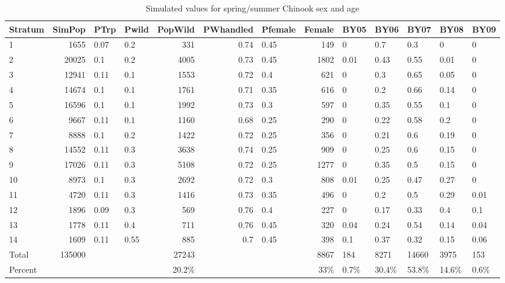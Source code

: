\documentclass[12pt]{article}
\begin{document}
\begin{sidewaystable} %
\caption{Simulated values for spring/summer Chinook sex and age}
\label{table:CHsimSA} 
\centering
\begin{tabular}{ | l | r | l | l | r | r | l | r | l | l | l | l | l | }
\hline
Stratum&SimPop&PTrp&Pwild&PopWild&PWhandled&Pfemale&Female&BY05&BY06&BY07&BY08&BY09 \\ \hline
1&1655&0.07&0.2&331&0.74&0.45&149&0&0.7&0.3&0&0 \\ \hline
2&20025&0.1&0.2&4005&0.73&0.45&1802&0.01&0.43&0.55&0.01&0 \\ \hline
3&12941&0.11&0.1&1553&0.72&0.4&621&0&0.3&0.65&0.05&0 \\ \hline
4&14674&0.1&0.1&1761&0.71&0.35&616&0&0.2&0.66&0.14&0 \\ \hline
5&16596&0.1&0.1&1992&0.73&0.3&597&0&0.35&0.55&0.1&0 \\ \hline
6&9667&0.11&0.1&1160&0.68&0.25&290&0&0.22&0.58&0.2&0 \\ \hline
7&8888&0.1&0.2&1422&0.72&0.25&356&0&0.21&0.6&0.19&0 \\ \hline
8&14552&0.11&0.3&3638&0.74&0.25&909&0&0.25&0.6&0.15&0 \\ \hline
9&17026&0.11&0.3&5108&0.72&0.25&1277&0&0.35&0.5&0.15&0 \\ \hline
10&8973&0.1&0.3&2692&0.72&0.3&808&0.01&0.25&0.47&0.27&0 \\ \hline
11&4720&0.11&0.3&1416&0.73&0.35&496&0&0.2&0.5&0.29&0.01 \\ \hline
12&1896&0.09&0.3&569&0.76&0.4&227&0&0.17&0.33&0.4&0.1 \\ \hline
13&1778&0.11&0.4&711&0.76&0.45&320&0.04&0.24&0.54&0.14&0.04 \\ \hline
14&1609&0.11&0.55&885&0.7&0.45&398&0.1&0.37&0.32&0.15&0.06 \\ \hline
Total&135000&&&27243&&&8867&184&8271&14660&3975&153 \\ \hline
Percent&&&&20.2\%&&&33\%&0.7\%&30.4\%&53.8\%&14.6\%&0.6\% \\ \hline
\end{tabular}
\end{sidewaystable}
\end{document}

